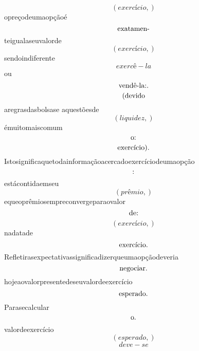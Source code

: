 \documentclass{article}
\begin{document}
\begin{equation}
\left( exercício,\right)
\end{equation}opreçodeumaopçãoé\begin{equation}
$exatamen-$
\end{equation}teigualaseuvalorde\begin{equation}
\left( exercício,\right)
\end{equation}sendoindiferente\begin{equation}
exercê - la
\end{equation}ou\begin{equation}
$vendê-la:.$
\end{equation}\begin{equation}
$(devido$
\end{equation}aregrasdasbolsase aquestõesde\begin{equation}
\left( liquidez,\right)
\end{equation}émuitomaiscomum\begin{equation}
$o:$
\end{equation}\begin{equation}
$exercício).$
\end{equation}Istosignificaquetodainformaçãoacercadoexercíciodeumaopção\begin{equation}
$:$
\end{equation}estácontidaemseu\begin{equation}
\left( prêmio,\right)
\end{equation}equeoprêmiosempreconvergeparaovalor\begin{equation}
$de:$
\end{equation}\begin{equation}
\left( exercício,\right)
\end{equation}nadatade\begin{equation}
$exercício.$
\end{equation}Refletirasexpectativassignificadizerqueumaopçãodeveria\begin{equation}
$negociar.$
\end{equation}hojeaovalorpresentedeseuvalordeexercício\begin{equation}
$esperado.$
\end{equation}Parasecalcular\begin{equation}
$o.$
\end{equation}valordeexercício\begin{equation}
\left( esperado,\right)
\end{equation}\begin{equation}
deve - se

\end{equation}
\end{document}

